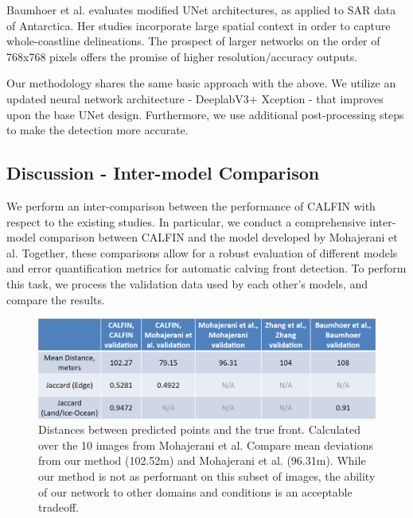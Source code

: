 \documentclass[tc, manuscript]{copernicus}
\begin{document}
Baumhoer et al.\citep{baumhoer2019} evaluates modified UNet architectures, as applied to SAR data of Antarctica. Her studies incorporate large spatial context in order to capture whole-coastline delineations. The prospect of larger networks on the order of 768x768 pixels offers the promise of higher resolution/accuracy outputs.

Our methodology shares the same basic approach with the above. We utilize an updated neural network architecture - DeeplabV3+ Xception - that improves upon the base UNet design. Furthermore, we use additional post-processing steps to make the detection more accurate.

\subsection{Discussion - Inter-model Comparison}
We perform an inter-comparison between the performance of CALFIN with respect to the existing studies. In particular, we conduct a comprehensive inter-model comparison between CALFIN and the model developed by Mohajerani et al. Together, these comparisons allow for a robust evaluation of different models and error quantification metrics for automatic calving front detection. To perform this task, we process the validation data used by each other's models, and compare the results.

\begin{figure}[t]
\includegraphics[width=16.0cm]{intercomp-table.png}
\caption{Distances between predicted points and the true front. Calculated over the 10 images from Mohajerani et al. Compare mean deviations from our method (102.52m) and Mohajerani et al. (96.31m). While our method is not as performant on this subset of images, the ability of our network to other domains and conditions is an acceptable tradeoff.}
\centering
\end{figure}
\end{document}
